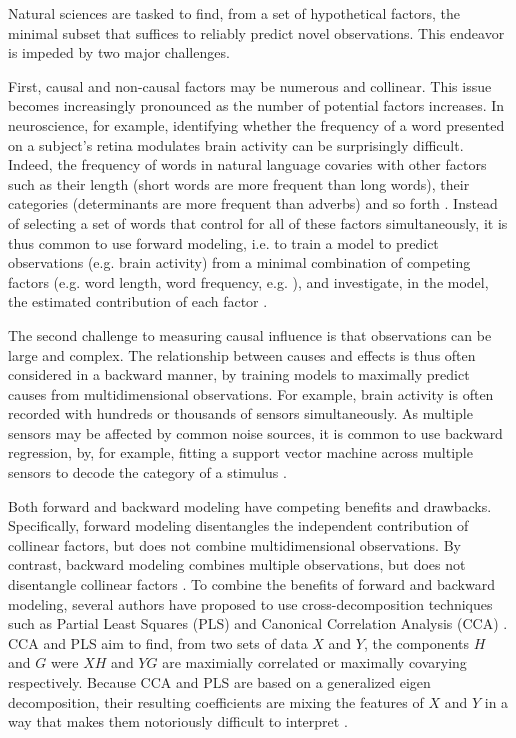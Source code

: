 Natural sciences are tasked to find, from a set of hypothetical factors, the minimal subset that suffices to reliably predict novel observations. This endeavor is impeded by two major challenges.

First, causal and non-causal factors may be numerous and collinear. %
This issue becomes increasingly pronounced as the number of potential factors increases. In neuroscience, for example, identifying whether the frequency of a word presented on a subject's retina modulates brain activity can be surprisingly difficult. Indeed, the frequency of words in natural language covaries with other factors such as their length (short words are more frequent than long words), their categories (determinants are more frequent than adverbs) and so forth \citep{kutas2011thirty,pegado2014timing}. Instead of selecting a set of words that control for all of these factors simultaneously, it is thus common to use forward modeling, i.e. to train a model to predict observations (e.g. brain activity) from a minimal combination of competing factors (e.g. word length, word frequency, e.g. \citep{huth2016natural}), and investigate, in the model, the estimated contribution of each factor \citep{friston1994statistical}.

The second challenge to measuring causal influence is that observations can be large and complex. The relationship between causes and effects is thus often considered in a backward manner, by training models to maximally predict causes from multidimensional observations. For example, brain activity is often recorded with hundreds or thousands of sensors simultaneously. As multiple sensors may be affected by common noise sources, it is common to use backward regression, by, for example, fitting a support vector machine across multiple sensors to decode the category of a stimulus \citep{cichy2014resolving,  kriegeskorte2008representational, norman2006beyond}.

Both forward and backward modeling have competing benefits and drawbacks. Specifically, forward modeling disentangles the independent contribution of collinear factors, but does not combine multidimensional observations. By contrast, backward modeling combines multiple observations, but does not disentangle collinear factors \citep{weichwald2015causal, hebart2018deconstructing, king2018encoding}. To combine the benefits of forward and backward modeling, several authors have proposed to use cross-decomposition techniques such as Partial Least Squares (PLS) and Canonical Correlation Analysis (CCA) \citep{de2019multiway}.
CCA and PLS aim to find, from two sets of data $X$ and $Y$, the components $H$ and $G$ were $XH$ and $YG$ are maximially correlated or maximally covarying respectively. Because CCA and PLS are based on a generalized eigen decomposition, their resulting coefficients are mixing the features of $X$ and $Y$ in a way that makes them notoriously difficult to interpret \citep{lebart1995statistique}.

